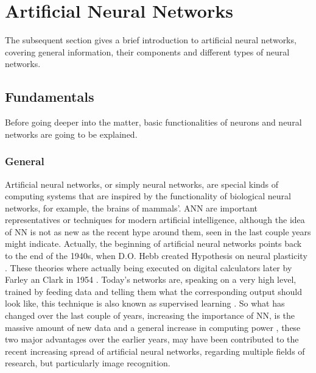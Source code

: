 \chapter{Artificial Neural Networks}\label{chapter:Artificial Neural Networks}
The subsequent section gives a brief introduction to artificial neural networks, covering general information, their components and different types of neural networks.

\section{Fundamentals}
Before going deeper into the matter, basic functionalities of neurons and neural networks are going to be explained.
\subsection{General}
Artificial neural networks, or simply neural networks, are special kinds of computing systems that are inspired by the functionality of biological neural networks, for example, the brains of mammals'. ANN are important representatives or techniques for modern artificial intelligence, although the idea of NN is not as new as the recent hype around them, seen in the last couple years might indicate. Actually, the beginning of artificial neural networks points back to the end of the 1940s, when D.O. Hebb created Hypothesis on neural plasticity \cite{hebb}. These theories where actually being executed on digital calculators later by Farley an Clark in 1954 \cite{farleyclark}. Today's networks are, speaking on a very high level,  trained by feeding data and telling them what the corresponding output should look like, this technique is also known as supervised learning \cite[p. 96f]{goodfellow}. \newline
So what has changed over the last couple of years, increasing the importance of NN, is the massive amount of new data and a general increase in computing power \cite{moore}, these two major advantages over the earlier years, may have been contributed to the recent increasing spread of artificial neural networks, regarding multiple fields of research, but particularly image recognition.
\newpage
